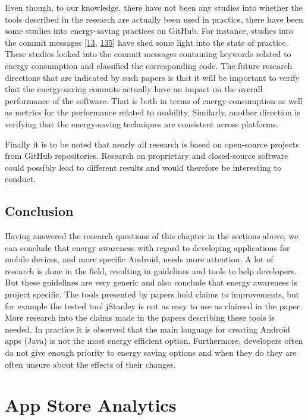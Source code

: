 \documentclass[]{book}
\begin{document}
Even though, to our knowledge, there have not been any studies into
whether the tools described in the research are actually been used in
practice, there have been some studies into energy-saving practices on
GitHub. For instance, studies into the commit messages
{[}\protect\hyperlink{ref-BLXWT2016}{13},
\protect\hyperlink{ref-MPEC2015}{135}{]} have shed some light into the
state of practice. These studies looked into the commit messages
containing keywords related to energy consumption and classified the
corresponding code. The future research directions that are indicated by
such papers is that it will be important to verify that the
energy-saving commits actually have an impact on the overall performance
of the software. That is both in terms of energy-consumption as well as
metrics for the performance related to usability. Similarly, another
direction is verifying that the energy-saving techniques are consistent
across platforms.

Finally it is to be noted that nearly all research is based on
open-source projects from GitHub repositories. Research on proprietary
and closed-source software could possibly lead to different results and
would therefore be interesting to conduct.

\section{Conclusion}\label{conclusion-2}

Having answered the research questions of this chapter in the sections
above, we can conclude that energy awareness with regard to developing
applications for mobile devices, and more specific Android, needs more
attention. A lot of research is done in the field, resulting in
guidelines and tools to help developers. But these guidelines are very
generic and also conclude that energy awareness is project specific. The
tools presented by papers hold claims to improvements, but for example
the tested tool jStanley is not as easy to use as claimed in the paper.
More research into the claims made in the papers describing these tools
is needed. In practice it is observed that the main language for
creating Android apps (Java) is not the most energy efficient option.
Furthermore, developers often do not give enough priority to energy
saving options and when they do they are often unsure about the effects
of their changes.

\chapter{App Store Analytics}\label{app-store-analytics}
\end{document}
